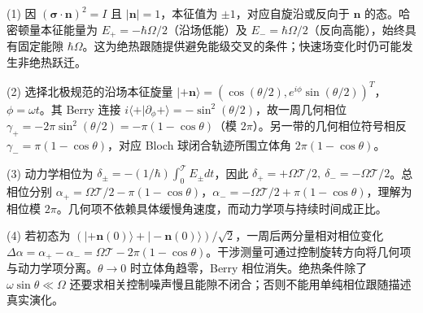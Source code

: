 (1) 因 \((\boldsymbol\sigma\cdot\boldsymbol n)^2=I\) 且 \(|\boldsymbol n|=1\)，本征值为 \(\pm1\)，对应自旋沿或反向于 \(\boldsymbol n\) 的态。哈密顿量本征能量为 \(E_+=-\hbar\Omega/2\)（沿场低能）及 \(E_-=\hbar\Omega/2\)（反向高能），始终具有固定能隙 \(\hbar\Omega\)。这为绝热跟随提供避免能级交叉的条件；快速场变化时仍可能发生非绝热跃迁。

(2) 选择北极规范的沿场本征旋量 \(|+\boldsymbol n\rangle=(\cos(\theta/2),e^{i\phi}\sin(\theta/2))^T\)，\(\phi=\omega t\)。其 Berry 连接 \(i\langle+|\partial_\phi+\rangle=-\sin^2(\theta/2)\)，故一周几何相位 \(\gamma_+=-2\pi\sin^2(\theta/2)=-\pi(1-\cos\theta)\)（模 \(2\pi\)）。另一带的几何相位符号相反 \(\gamma_-=\pi(1-\cos\theta)\)，对应 Bloch 球闭合轨迹所围立体角 \(2\pi(1-\cos\theta)\)。

(3) 动力学相位为 \(\delta_\pm=-(1/\hbar)\int_0^{\mathcal T}E_\pm dt\)，因此 \(\delta_+=+\Omega\mathcal T/2,\ \delta_-=-\Omega\mathcal T/2\)。总相位分别 \(\alpha_+=\Omega\mathcal T/2-\pi(1-\cos\theta)\)，\(\alpha_-=-\Omega\mathcal T/2+\pi(1-\cos\theta)\)，理解为相位模 \(2\pi\)。几何项不依赖具体缓慢角速度，而动力学项与持续时间成正比。

(4) 若初态为 \((|+\boldsymbol n(0)\rangle+|-\boldsymbol n(0)\rangle)/\sqrt2\)，一周后两分量相对相位变化 \(\Delta\alpha=\alpha_+-\alpha_-=\Omega\mathcal T-2\pi(1-\cos\theta)\)。干涉测量可通过控制旋转方向将几何项与动力学项分离。\(\theta\to0\) 时立体角趋零，Berry 相位消失。绝热条件除了 \(\omega\sin\theta\ll\Omega\) 还要求相关控制噪声慢且能隙不闭合；否则不能用单纯相位跟随描述真实演化。
